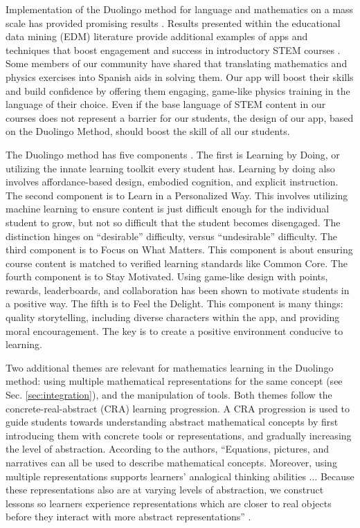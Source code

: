\documentclass[11pt]{amsart}
\begin{document}
Implementation of the Duolingo method for language and mathematics on a mass scale has provided promising results \cite{duolingo_whitepaper}.  Results presented within the educational data mining (EDM) literature provide additional examples of apps and techniques that boost engagement and success in introductory STEM courses \cite{edm1,edm2,edm3,edm4}.  Some members of our community have shared that translating mathematics and physics exercises into Spanish aids in solving them.  Our app will boost their skills and build confidence by offering them engaging, game-like physics training in the language of their choice.  Even if the base language of STEM content in our courses does not represent a barrier for our students, the design of our app, based on the Duolingo Method, should boost the skill of all our students. 

The Duolingo method has five components \cite{duolingo_whitepaper}.  The first is Learning by Doing, or utilizing the innate learning toolkit every student has.  Learning by doing also involves affordance-based design, embodied cognition, and explicit instruction.  The second component is to Learn in a Personalized Way.  This involves utilizing machine learning to ensure content is just difficult enough for the individual student to grow, but not so difficult that the student becomes disengaged.  The distinction hinges on ``desirable'' difficulty, versus ``undesirable'' difficulty.  The third component is to Focus on What Matters.  This component is about ensuring course content is matched to verified learning standards like Common Core.  The fourth component is to Stay Motivated.  Using game-like design with points, rewards, leaderboards, and collaboration has been shown to motivate students in a positive way.  The fifth is to Feel the Delight. This component is many things: quality storytelling, including diverse characters within the app, and providing moral encouragement.  The key is to create a positive environment conducive to learning.  

Two additional themes are relevant for mathematics learning in the Duolingo method: using multiple mathematical representations for the same concept (see Sec. \ref{sec:integration}), and the manipulation of tools.  Both themes follow the concrete-real-abstract (CRA) learning progression.  A CRA progression is used to guide students towards understanding abstract mathematical concepts by first introducing them with concrete tools or representations, and gradually increasing the level of abstraction.  According to the authors, ``Equations, pictures, and narratives can all be used to describe mathematical concepts.  Moreover, using multiple representations supports learners' analogical thinking abilities ... Because these representations also are at varying levels of abstraction, we construct lessons so learners experience representations which are closer to real objects before they interact with more abstract representations'' \cite{duolingo_whitepaper}. 
\end{document}
